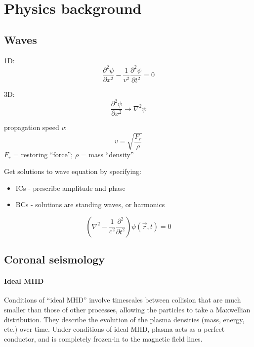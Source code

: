 









\clearpage
\section{Physics background}

\subsection{Waves}

1D:
\[
    \frac{\partial^{2}\psi}{\partial x^{2}}
    - \frac{1}{v^{2}}\frac{\partial^{2}\psi}{\partial t^{2}}
    = 0
    \]

3D:
\[
    \frac{\partial^{2}\psi}{\partial x^{2}} \rightarrow
    \nabla^{2}\psi
    \]


propagation speed $v$:
\[
    v = \sqrt{ \frac{F_{r}}{\rho}}
    \]
$F_{r}$ = restoring ``force'';
$\rho$ = mass ``density''

Get solutions to wave equation by specifying:
\begin{itemize}
    \item ICs - prescribe amplitude and phase
    \item BCs - solutions are standing waves, or harmonics
\end{itemize}


\[
    \left( \nabla^{2} - \frac{1}{c^{2}} \frac{\partial^{2}}{\partial t^{2}} \right)
    \psi\left( \vec{r},t \right)
    = 0
    \]

\subsection{Coronal seismology}\label{cs}

\paragraph{Ideal MHD}\label{idealMHD}
Conditions of ``ideal MHD'' involve timescales between collision that are much
smaller than those of other processes, allowing the particles to take a
Maxwellian distribution. They describe the evolution of the plasma densities
(mass, energy, etc.) over time. Under conditions of ideal MHD, plasma acts as a
perfect conductor, and is completely frozen-in to the magnetic field lines.

